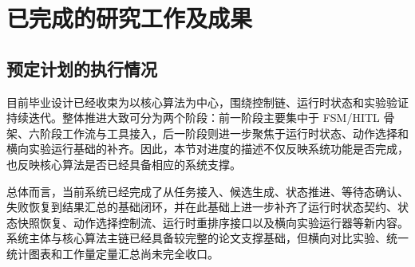 \section{已完成的研究工作及成果}

\subsection{预定计划的执行情况}

目前毕业设计已经收束为以核心算法为中心，围绕控制链、运行时状态和实验验证持续迭代。整体推进大致可分为两个阶段：前一阶段主要集中于 FSM/HITL 骨架、六阶段工作流与工具接入，后一阶段则进一步聚焦于运行时状态、动作选择和横向实验运行基础的补齐。因此，本节对进度的描述不仅反映系统功能是否完成，也反映核心算法是否已经具备相应的系统支撑。

总体而言，当前系统已经完成了从任务接入、候选生成、状态推进、等待态确认、失败恢复到结果汇总的基础闭环，并在此基础上进一步补齐了运行时状态契约、状态快照恢复、动作选择控制流、运行时重排序接口以及横向实验运行器等新内容。系统主体与核心算法主链已经具备较完整的论文支撑基础，但横向对比实验、统一统计图表和工作量定量汇总尚未完全收口。

